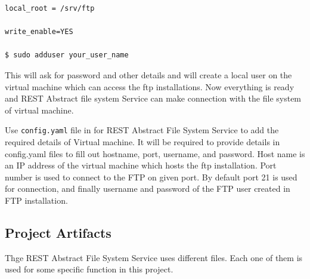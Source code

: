 \begin{verbatim}
local_root = /srv/ftp  

write_enable=YES       

$ sudo adduser your_user_name    
\end{verbatim}

This will ask for password and other details and will create a local
user on the virtual machine which can access the ftp installations.
Now everything is ready and REST Abstract file system Service can 
make connection with the file system of virtual machine.


Use \verb|config.yaml| file in for REST Abstract File System Service
to add the required details of Virtual machine.  It will be required
to provide details in config.yaml files to fill out hostname, port,
username, and password.
Host name is an IP address of the virtual machine which hosts the ftp 
installation. Port number is used to connect to the FTP on given port. By 
default port 21 is used for connection, and finally username and password of 
the FTP user created in FTP installation.


\subsection{Project Artifacts}

Thge REST Abstract File System Service uses different files. 
Each one of them is used for some specific function in this project.

